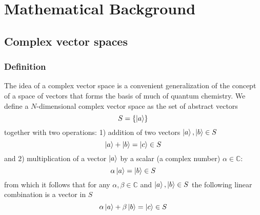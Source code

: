 \documentclass[../Main/chem532-notes.tex]{subfiles}
\begin{document}
\setcounter{chapter}{-1}

\chapter{Mathematical Background}

\section{Complex vector spaces}

\subsection{Definition}

The idea of a complex vector space is a convenient generalization of the concept of a space of vectors that forms the basis of much of quantum chemistry.
We define a $N$-dimensional complex vector space as the set of abstract vectors
\begin{equation}
S = \{ \ket{a} \}
\end{equation}
together with two operations: 1) addition of two vectors $\ket{a},\ket{b} \in S$
\begin{equation}
\ket{a} +\ket{b} = \ket{c} \in S
\end{equation}
and 2) multiplication of a vector $\ket{a}$ by a scalar (a complex number) $\alpha \in \mathbb{C}$:
\begin{equation}
\alpha \ket{a} = \ket{b} \in S
\end{equation}
from which it follows that for any $\alpha, \beta \in \mathbb{C}$ and $\ket{a},\ket{b} \in S$ the following linear combination is a vector in $S$
\begin{equation}
\alpha \ket{a} + \beta \ket{b} = \ket{c} \in S
\end{equation}
\end{document}
